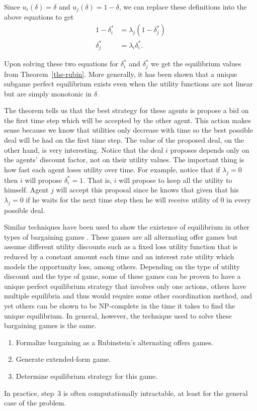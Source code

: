 Since $u_i(\delta) = \delta$ and $u_j(\delta) = 1 - \delta$, we can
replace these definitions into the above equations to get
\begin{align}
  1 - \delta_i^* &= \lambda_j(1 - \delta_j^*) \\
  \delta_j^* &= \lambda_i\delta_i^*.
\end{align}

Upon solving these two equations for $\delta_i^*$ and $\delta_j^*$ we
get the equilibrium values from Theorem~\ref{the-rubin}. More
generally, it has been shown that a unique subgame perfect equilibrium
exists even when the utility functions are not linear but are simply
monotonic in $\delta$.

The theorem tells us that the best strategy for these agents is
propose a bid on the first time step which will be accepted by the
other agent. This action makes sense because we know that utilities
only decrease with time so the best possible deal will be had on the
first time step. The value of the proposed deal, on the other hand, is
very interesting. Notice that the deal $i$ proposes depends only on
the agents' discount factor, not on their utility values. The
important thing is how fast each agent loses utility over time.  For
example, notice that if $\lambda_j = 0$ then $i$ will propose
$\delta_i^* = 1$. That is, $i$ will propose to keep all the utility to
himself. Agent $j$ will accept this proposal since he knows that given
that his $\lambda_j = 0$ if he waits for the next time step then he
will receive utility of 0 in every possible deal.

\medskip

Similar techniques have been used to show the existence of equilibrium
in other types of bargaining games \cite{kraus01a}. These games are
all alternating offer games but assume different utility discounts
such as a fixed loss utility function that is reduced by a constant
amount each time and an interest rate utility which models the
opportunity loss, among others. Depending on the type of utility
discount and the type of game, some of these games can be proven to
have a unique perfect equilibrium strategy that involves only one
actions, others have multiple equilibria and thus would require some
other coordination method, and yet others can be shown to be
NP-complete in the time it takes to find the unique equilibrium.  In
general, however, the technique used to solve these bargaining games
is the same.
\begin{enumerate}
\item Formalize bargaining as a Rubinstein's alternating offers games.
\item Generate extended-form game.
\item Determine equilibrium strategy for this game.
\end{enumerate}
In practice, step~3 is often computationally intractable, at least for
the general case of the problem.


